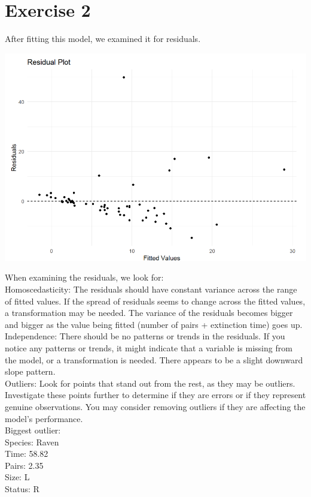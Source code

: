 \documentclass{article}
\begin{document}
\section{Exercise 2}

After fitting this model, we examined it for residuals.

\begin{center}
\includegraphics[scale=0.5]{graphs/residual.png}
\end{center}


When examining the residuals, we look for: \\

Homoscedasticity: The residuals should have constant variance across the range of fitted values. If the spread of residuals seems to change across the fitted values, a transformation may be needed.
The variance of the residuals becomes bigger and bigger as the value being fitted (number of pairs + extinction time) goes up. \\

Independence: There should be no patterns or trends in the residuals. If you notice any patterns or trends, it might indicate that a variable is missing from the model, or a transformation is needed.
There appears to be a slight downward slope pattern. \\

Outliers: Look for points that stand out from the rest, as they may be outliers. Investigate these points further to determine if they are errors or if they represent genuine observations. You may consider removing outliers if they are affecting the model’s performance. \\
Biggest outlier: \\
Species: Raven \\
Time: 58.82 \\
Pairs: 2.35 \\
Size: L \\
Status: R \\
\end{document}
